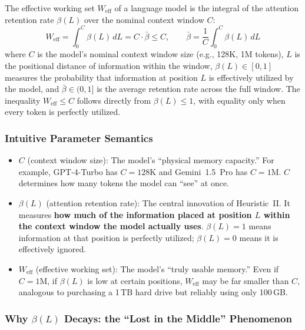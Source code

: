 \begin{heuristic}
The effective working set $W_{\mathrm{eff}}$ of a language model is the integral of the attention retention rate $\beta(L)$ over the nominal context window $C$:
\begin{equation}
\label{eq:context}
W_{\mathrm{eff}} = \int_0^C \beta(L)\,dL = C \cdot \bar{\beta} \leq C, \qquad \bar{\beta} = \frac{1}{C}\int_0^C \beta(L)\,dL
\end{equation}
where $C$ is the model's nominal context window size (e.g., 128K, 1M tokens), $L$ is the positional distance of information within the window, $\beta(L) \in [0,1]$ measures the probability that information at position $L$ is effectively utilized by the model, and $\bar{\beta} \in (0,1]$ is the average retention rate across the full window. The inequality $W_{\mathrm{eff}} \leq C$ follows directly from $\beta(L) \leq 1$, with equality only when every token is perfectly utilized.
\end{heuristic}

\subsubsection{Intuitive Parameter Semantics}

\begin{itemize}[nosep]
\item $C$ (context window size): The model's ``physical memory capacity.'' For example, GPT-4-Turbo has $C = 128\mathrm{K}$ and Gemini~1.5~Pro has $C = 1\mathrm{M}$. $C$ determines how many tokens the model can ``see'' at once.

\item $\beta(L)$ (attention retention rate): The central innovation of Heuristic~II. It measures \textbf{how much of the information placed at position $L$ within the context window the model actually uses}. $\beta(L) = 1$ means information at that position is perfectly utilized; $\beta(L) = 0$ means it is effectively ignored.

\item $W_{\mathrm{eff}}$ (effective working set): The model's ``truly usable memory.'' Even if $C = 1\mathrm{M}$, if $\beta(L)$ is low at certain positions, $W_{\mathrm{eff}}$ may be far smaller than $C$, analogous to purchasing a 1\,TB hard drive but reliably using only 100\,GB.
\end{itemize}

\subsubsection{Why $\beta(L)$ Decays: the ``Lost in the Middle'' Phenomenon}

